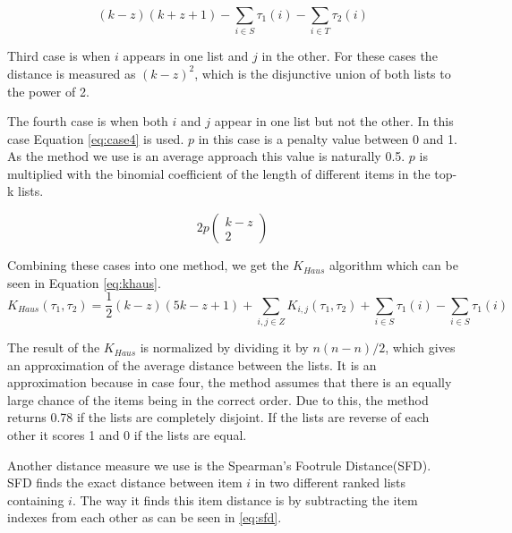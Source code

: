 \begin{equation}\label{eq:case2}
(k-z)(k+z+1)- \sum_{i \in S} \tau_1(i)- \sum_{i \in T} \tau_2(i)
\end{equation}

Third case is when $i$ appears in one list and $j$ in the other. For these cases the distance is measured as $(k-z)^2$, which is the disjunctive union of both lists to the power of 2.

The fourth case is when both $i$ and $j$ appear in one list but not the other. In this case Equation \ref{eq:case4} is used. $p$ in this case is a penalty value between 0 and 1. As the method we use is an average approach this value is naturally 0.5. $p$ is multiplied with the binomial coefficient of the length of different items in the top-k lists.

\begin{equation}\label{eq:case4}
2p\left(\!
    \begin{array}{c}
      k-z \\
      2
    \end{array}
  \!\right)
\end{equation}


Combining these cases into one method, we get the $K_{Haus}$ algorithm which can be seen in Equation \ref{eq:khaus}. 
\footnotesize
\begin{equation}\label{eq:khaus}
K_{Haus}(\tau_1,\tau_2) = \frac{1}{2}(k-z)(5k-z+1)+ \sum_{i,j \in Z} K_{i,j}(\tau_1,\tau_2) + \sum_{i \in S}\tau_1(i) - \sum_{i \in S}\tau_1(i)
\end{equation}
\normalsize

The result of the $K_{Haus}$ is normalized by dividing it by $n(n-n)/2$, which gives an approximation of the average distance between the lists. It is an approximation because in case four, the method assumes that there is an equally large chance of the items being in the correct order. Due to this, the method returns 0.78 if the lists are completely disjoint. If the lists are reverse of each other it scores 1 and 0 if the lists are equal. %


Another distance measure we use is the Spearman's Footrule Distance(SFD). SFD finds the exact distance between item $i$ in two different ranked lists containing $i$. The way it finds this item distance is by subtracting the item indexes from each other as can be seen in \ref{eq:sfd}. 

